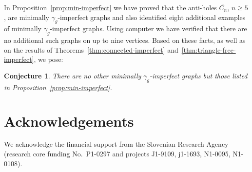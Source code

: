 \documentclass[12pt]{article}
\newtheorem{conjecture}[theorem]{Conjecture}
\begin{document}
In Proposition~\ref{prop:min-imperfect} we have proved that the anti-holes $\overline{C_n}$, $n\ge 5$, are minimally $\gamma_g$-imperfect graphs and also identified eight additional examples of  minimally $\gamma_g$-imperfect graphs.   Using computer we have verified that there are no additional such graphs on up to nine vertices. Based on these facts, as well as on the results of Theorems~\ref{thm:connected-imperfect} and~\ref{thm:triangle-free-imperfect}, we pose:

\begin{conjecture}
	There are no other minimally $\gamma_g$-imperfect graphs but those listed in Proposition~\ref{prop:min-imperfect}.  
\end{conjecture}

\section*{Acknowledgements}

We acknowledge the financial support from the Slovenian Research Agency (research core funding No.\ P1-0297 and projects J1-9109, j1-1693, N1-0095, N1-0108). 
\end{document}
